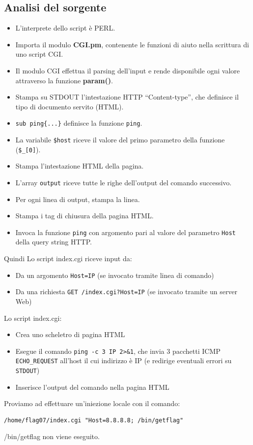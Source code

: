\subsection{Analisi del sorgente}
\begin{itemize}
    \item L'interprete dello script è PERL.
    \item Importa il modulo \textbf{CGI.pm}, contenente le funzioni di aiuto nella scrittura di uno script CGI.
    \item Il modulo CGI effettua il parsing dell'input e rende disponibile ogni valore attraverso la funzione \textbf{param()}.
    \item Stampa su STDOUT l'intestazione HTTP “Content-type”, che definisce il tipo di documento servito (HTML).
    \item \texttt{sub ping\{...\}} definisce la funzione \texttt{ping}.
    \item La variabile \texttt{\$host} riceve il valore del primo parametro della funzione (\texttt{\$\_[0]}).
    \item Stampa l'intestazione HTML della pagina.
    \item L'array \texttt{output} riceve tutte le righe dell'output del comando successivo.
    \item Per ogni linea di output, stampa la linea.
    \item Stampa i tag di chiusura della pagina HTML.
    \item Invoca la funzione \texttt{ping} con argomento pari al valore del parametro \texttt{Host} della query string HTTP.
\end{itemize}

Quindi Lo script index.cgi riceve input da:
\begin{itemize}
    \item Da un argomento \texttt{Host=IP} (se invocato tramite linea di comando)
    \item Da una richiesta \texttt{GET /index.cgi?Host=IP} (se invocato tramite un server Web)
\end{itemize}
Lo script index.cgi:
\begin{itemize}
    \item Crea uno scheletro di pagina HTML
    \item Esegue il comando \texttt{ping -c 3 IP 2>\&1}, che invia 3 pacchetti ICMP \texttt{ECHO\_REQUEST} all’host il cui indirizzo è IP (e redirige eventuali errori su \texttt{STDOUT})
    \item Inserisce l’output del comando nella pagina HTML
\end{itemize}
Proviamo ad effettuare un’iniezione locale con il comando:
\begin{lstlisting}[style=bashstyle]
    /home/flag07/index.cgi "Host=8.8.8.8; /bin/getflag"
\end{lstlisting}
/bin/getflag non viene eseguito.

